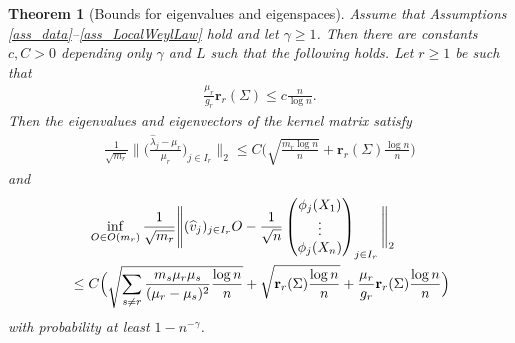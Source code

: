 \documentclass[a4paper,11pt]{article} %
\numberwithin{equation}{section}
\theoremstyle{definition}
\theoremstyle{remark}
\theoremstyle{plain}
\newtheorem{theorem}[definition]{Theorem}
\begin{document}
\begin{theorem}[Bounds for eigenvalues and eigenspaces]
  \label{thm_BoundsForEigenvaluesAndEigenspaces}
  Assume that Assumptions \ref{ass_data}--\ref{ass_LocalWeylLaw} hold and let $ \gamma \ge 1 $.
  Then there are constants $c, C>0$ depending only $ \gamma $ and $ L $ such that the following holds.
  Let $r \ge 1$ be such that 
  \begin{align}
    \frac{\mu_{r}}{g_{r}} \mathbf{r}_r(\Sigma) \leq c\frac{n}{\log n}.
  \end{align}
  Then the eigenvalues and eigenvectors of the kernel matrix satisfy 
  \begin{align}\label{eq:eva:bound:KS}
    \frac{1}{\sqrt{m_r}} \Big\| \Big(\frac{\widehat{\lambda}_j-\mu_r}{\mu_r}\Big)_{j \in I_r} \Big\|_2
    \le
    C \Big( \sqrt{\frac{m_r \log n}{n}} + \mathbf{r}_{r}(\Sigma) \frac{\log n}{n} \Big)
  \end{align}
  and
  \begin{align}\label{eq:ev:bound:KS}
    & \ \ \ \
    \inf_{O \in O(m_r)} 
    \frac{1}{ \sqrt{m_r} } \Bigg\| (\widehat v_j)_{j \in I_r}O - \frac{1}{\sqrt{n}}
                                                                \begin{pmatrix}
                                                                  \phi_j(X_1) \\
                                                                  \vdots      \\
                                                                  \phi_j(X_n) 
                                                                \end{pmatrix}_{j \in I_r} 
                           \Bigg\|_2
    \\
    &\le 
    C \Big( \sqrt{ \sum_{s \ne r} \frac{m_s \mu_r \mu_s}{(\mu_r - \mu_s)^2} \frac{\log n}{n} } 
          + \sqrt{ \mathbf{r}_{r}(\Sigma) \frac{\log n}{n}} 
          + \frac{\mu_r}{g_{r}} \mathbf{r}_{r}(\Sigma) \frac{\log n}{n}
      \Big)    
    \notag
  \end{align}
  with probability at least \( 1 - n^{-\gamma} \).
\end{theorem}
\end{document}
